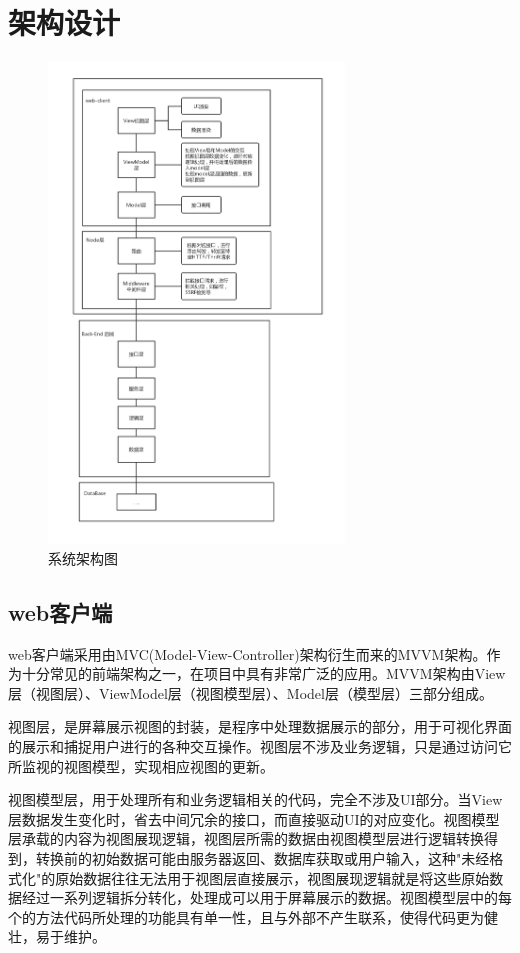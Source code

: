 \section{架构设计}
\begin{figure}[H]
    \centering
    \includegraphics[width=0.7\textwidth]{./Chapters/images/system_structure.png} %
    \caption{系统架构图} %
    \label{系统架构图} %
\end{figure}
\subsection{web客户端}
web客户端采用由MVC(Model-View-Controller)架构衍生而来的MVVM架构。作为十分常见的前端架构之一，在项目中具有非常广泛的应用。MVVM架构由View层（视图层）、ViewModel层（视图模型层）、Model层（模型层）三部分组成。

视图层，是屏幕展示视图的封装，是程序中处理数据展示的部分，用于可视化界面的展示和捕捉用户进行的各种交互操作。视图层不涉及业务逻辑，只是通过访问它所监视的视图模型，实现相应视图的更新。

视图模型层，用于处理所有和业务逻辑相关的代码，完全不涉及UI部分。当View层数据发生变化时，省去中间冗余的接口，而直接驱动UI的对应变化。视图模型层承载的内容为视图展现逻辑，视图层所需的数据由视图模型层进行逻辑转换得到，转换前的初始数据可能由服务器返回、数据库获取或用户输入，这种"未经格式化"的原始数据往往无法用于视图层直接展示，视图展现逻辑就是将这些原始数据经过一系列逻辑拆分转化，处理成可以用于屏幕展示的数据。视图模型层中的每个的方法代码所处理的功能具有单一性，且与外部不产生联系，使得代码更为健壮，易于维护。

